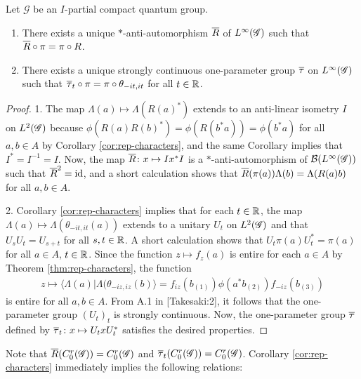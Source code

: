 \begin{Prop}
  Let $\mathscr{G}$ be an $I$-partial compact quantum group.  
  \begin{enumerate}
  \item There exists a unique $*$-anti-automorphism $\overline{R}$ of $L^{\infty}(\mathscr{G})$
    such that $\overline{R} \circ \pi = \pi \circ R$. 
  \item There exists a unique strongly continuous one-parameter group
    $\overline{\tau}$ on $L^{\infty}(\mathscr{G})$ such that $\overline{\tau}_{t} \circ \pi = \pi \circ
    \theta_{-it,it}$ for all $t\in \mathbb{R}$. 
  \end{enumerate}

\end{Prop}
\begin{proof}
1.  The map $\Lambda(a) \mapsto \Lambda(R(a)^{*})$ extends to an
  anti-linear isometry $I$ on $L^{2}(\mathscr{G})$ because $\phi(R(a)R(b)^{*}) =
  \phi(R(b^{*}a)) = \phi(b^{*}a)$ for all $a,b\in A$ by Corollary
  \ref{cor:rep-characters}, and the same Corollary implies that
  $I^{*}=I^{-1}=I$. Now, the map $\overline{R}\colon x \mapsto Ix^{*}I$
  is a $*$-anti-automorphism of $\mathcal{B}(L^{\infty}(\mathscr{G}))$ such that
  $\overline{R}^{2}=\operatorname{id}$, and a short calculation shows that
$\overline{R}(\pi(a))\Lambda(b) = \Lambda(R(a)b)$ for all $a,b\in A$.

2.  Corollary \ref{cor:rep-characters} implies that for each $t\in
\mathbb{R}$, the map $\Lambda(a) \mapsto \Lambda(\theta_{-it,it}(a))$ extends
to a unitary $U_{t}$ on $L^{2}(\mathscr{G})$ and that $U_{s}U_{t}=U_{s+t}$ for all
$s,t\in \mathbb{R}$. A short calculation shows that
$U_{t}\pi(a)U_{t}^{*}=\pi(a)$ for all $a \in A$, $t\in \mathbb{R}$. Since the function  $z\mapsto f_{z}(a)$ is entire for each
$a\in A$ by Theorem \ref{thm:rep-characters}, the function
\begin{align*}
  z \mapsto
\langle \Lambda(a)|\Lambda(\theta_{-iz,iz}(b)\rangle =f_{iz}(b_{(1)})\phi(a^{*}b_{(2)})f_{-iz}(b_{(3)})
\end{align*}
is entire for all $a,b\in A$. From A.1 in \cite{} [Takesaki:2], it
follows that the one-parameter group $(U_{t})_{t}$ is strongly
continuous. Now, the one-parameter group $\overline{\tau}$ defined by
$\overline{\tau}_{t}\colon x\mapsto U_{t}xU_{t}^{*}$ satisfies the desired
properties.
\end{proof}
Note that $\overline{R}(C^{r}_{0}(\mathscr{G}))=C^{r}_{0}(\mathscr{G})$ and $\overline{\tau}_{t}(C^{r}_{0}(\mathscr{G}))=C^{r}_{0}(\mathscr{G})$. Corollary
\ref{cor:rep-characters} immediately implies the following relations:
\begin{Cor}
  
\end{Cor}

